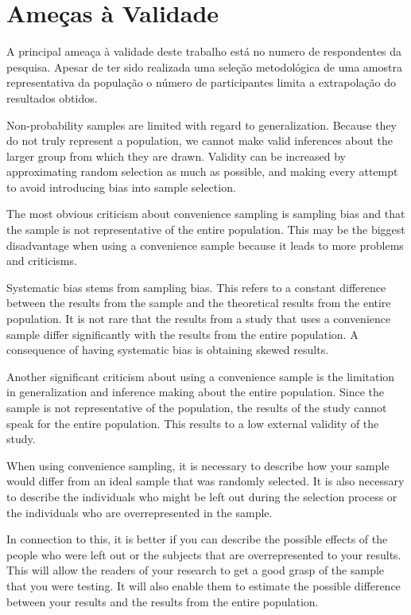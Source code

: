 \section{Ameças à Validade}
\label{sec:pesquisa_profissionais_ameacas_validade}

A principal ameaça à validade deste trabalho está no numero de respondentes da
pesquisa. Apesar de ter sido realizada uma seleção metodológica de uma amostra
representativa da população o número de participantes limita a extrapolação do
resultados obtidos.


Non-probability samples are limited with regard to generalization. Because they
do not truly represent a population, we cannot make valid inferences about the
larger group from which they are drawn. Validity can be increased by
approximating random selection as much as possible, and making every attempt to
avoid introducing bias into sample selection.

The most obvious criticism about convenience sampling is sampling bias and that
the sample is not representative of the entire population. This may be the
biggest disadvantage when using a convenience sample because it leads to more
problems and criticisms.

Systematic bias stems from sampling bias. This refers to a constant difference
between the results from the sample and the theoretical results from the entire
population. It is not rare that the results from a study that uses a convenience
sample differ significantly with the results from the entire population. A
consequence of having systematic bias is obtaining skewed results.

Another significant criticism about using a convenience sample is the limitation
in generalization and inference making about the entire population. Since the
sample is not representative of the population, the results of the study cannot
speak for the entire population. This results to a low external validity of the
study.


When using convenience sampling, it is necessary to describe how your sample
would differ from an ideal sample that was randomly selected. It is also
necessary to describe the individuals who might be left out during the selection
process or the individuals who are overrepresented in the sample.

In connection to this, it is better if you can describe the possible effects of
the people who were left out or the subjects that are overrepresented to your
results. This will allow the readers of your research to get a good grasp of the
sample that you were testing. It will also enable them to estimate the possible
difference between your results and the results from the entire population.

